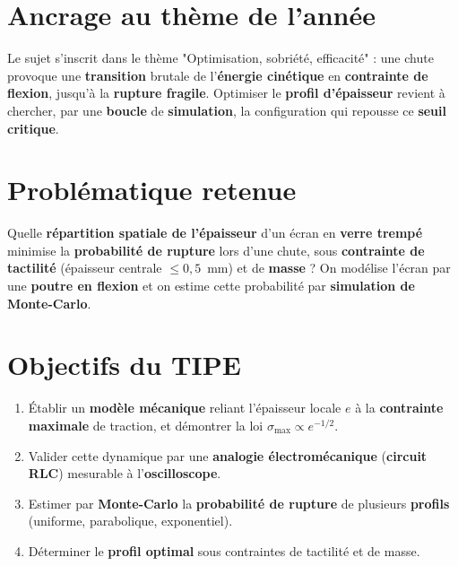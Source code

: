 \documentclass[11pt,a4paper]{article}
\begin{document}
\section{Ancrage au thème de l'année}
Le sujet s'inscrit dans le thème "Optimisation, sobriété, efficacité" : une
chute provoque une \textbf{transition} brutale de l'\textbf{énergie cinétique}
en \textbf{contrainte de flexion}, jusqu'à la \textbf{rupture fragile}.
Optimiser le \textbf{profil d'épaisseur} revient à chercher, par une
\textbf{boucle} de \textbf{simulation}, la configuration qui repousse ce
\textbf{seuil critique}.

\section{Problématique retenue}
Quelle \textbf{répartition spatiale de l'épaisseur} d'un écran en
\textbf{verre trempé} minimise la \textbf{probabilité de rupture} lors d'une
chute, sous \textbf{contrainte de tactilité} (épaisseur centrale
$\le 0{,}5$~mm) et de \textbf{masse} ? On modélise l'écran par une
\textbf{poutre en flexion} et on estime cette probabilité par
\textbf{simulation de Monte-Carlo}.

\section{Objectifs du TIPE}
\begin{enumerate}[leftmargin=1.6em,itemsep=1pt]
  \item Établir un \textbf{modèle mécanique} reliant l'épaisseur locale $e$ à la
        \textbf{contrainte maximale} de traction, et démontrer la loi
        $\sigma_{\max}\propto e^{-1/2}$.
  \item Valider cette dynamique par une \textbf{analogie électromécanique}
        (\textbf{circuit RLC}) mesurable à l'\textbf{oscilloscope}.
  \item Estimer par \textbf{Monte-Carlo} la \textbf{probabilité de rupture} de
        plusieurs \textbf{profils} (uniforme, parabolique, exponentiel).
  \item Déterminer le \textbf{profil optimal} sous contraintes de tactilité et
        de masse.
\end{enumerate}
\end{document}
